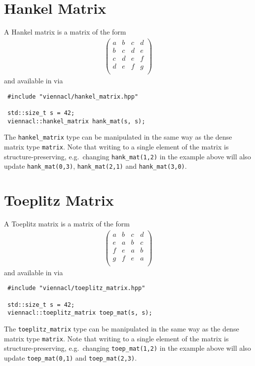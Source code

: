 \section{Hankel Matrix}
A Hankel matrix is a matrix of the form
\begin{align*}
 \left( \begin{array}{cccc}
         a & b & c & d \\
         b & c & d & e \\
         c & d & e & f \\
         d & e & f & g \\
        \end{array} \right)
\end{align*}
and available in {\ViennaCL} via
\begin{lstlisting}
 #include "viennacl/hankel_matrix.hpp"

 std::size_t s = 42;
 viennacl::hankel_matrix hank_mat(s, s);
\end{lstlisting}
The \lstinline|hankel_matrix| type can be manipulated in the same way as the dense matrix type \lstinline|matrix|. Note that writing to a single element of
the matrix is structure-preserving, e.g.~changing \lstinline|hank_mat(1,2)| in the example above will also update \lstinline|hank_mat(0,3)|,
\lstinline|hank_mat(2,1)| and
\lstinline|hank_mat(3,0)|.

\section{Toeplitz Matrix}
A Toeplitz matrix is a matrix of the form
\begin{align*}
 \left( \begin{array}{cccc}
         a & b & c & d \\
         e & a & b & c \\
         f & e & a & b \\
         g & f & e & a \\
        \end{array} \right)
\end{align*}
and available in {\ViennaCL} via
\begin{lstlisting}
 #include "viennacl/toeplitz_matrix.hpp"

 std::size_t s = 42;
 viennacl::toeplitz_matrix toep_mat(s, s);
\end{lstlisting}
The \lstinline|toeplitz_matrix| type can be manipulated in the same way as the dense matrix type \lstinline|matrix|. Note that writing to a single element of
the matrix is structure-preserving, e.g.~changing \lstinline|toep_mat(1,2)| in the example above will also update \lstinline|toep_mat(0,1)| and
\lstinline|toep_mat(2,3)|.


